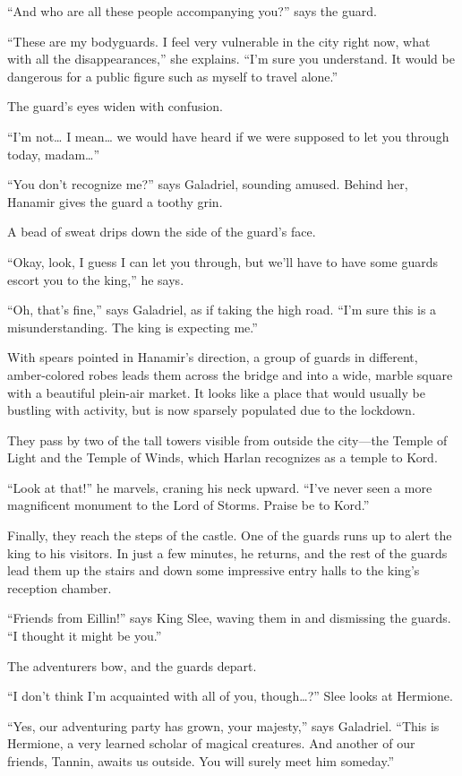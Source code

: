 \documentclass[smalldemyvopaper,11pt,twoside,onecolumn,openright,extrafontsizes]{memoir}
\begin{document}
``And who are all these people accompanying you?'' says the guard.

``These are my bodyguards. I feel very vulnerable in the city right now,
what with all the disappearances,'' she explains. ``I'm sure you
understand. It would be dangerous for a public figure such as myself to
travel alone.''

The guard's eyes widen with confusion.

``I'm not\ldots{} I mean\ldots{} we would have heard if we were supposed
to let you through today, madam\ldots{}''

``You don't recognize me?'' says Galadriel, sounding amused. Behind her,
Hanamir gives the guard a toothy grin.

A bead of sweat drips down the side of the guard's face.

``Okay, look, I guess I can let you through, but we'll have to have some
guards escort you to the king,'' he says.

``Oh, that's fine,'' says Galadriel, as if taking the high road. ``I'm
sure this is a misunderstanding. The king is expecting me.''

With spears pointed in Hanamir's direction, a group of guards in
different, amber-colored robes leads them across the bridge and into a
wide, marble square with a beautiful plein-air market. It looks like a
place that would usually be bustling with activity, but is now sparsely
populated due to the lockdown.

They pass by two of the tall towers visible from outside the city---the
Temple of Light and the Temple of Winds, which Harlan recognizes as a
temple to Kord.

``Look at that!'' he marvels, craning his neck upward. ``I've never seen
a more magnificent monument to the Lord of Storms. Praise be to Kord.''

Finally, they reach the steps of the castle. One of the guards runs up
to alert the king to his visitors. In just a few minutes, he returns,
and the rest of the guards lead them up the stairs and down some
impressive entry halls to the king's reception chamber.

``Friends from Eillin!'' says King Slee, waving them in and dismissing
the guards. ``I thought it might be you.''

The adventurers bow, and the guards depart.

``I don't think I'm acquainted with all of you, though\ldots?'' Slee
looks at Hermione.

``Yes, our adventuring party has grown, your majesty,'' says Galadriel.
``This is Hermione, a very learned scholar of magical creatures. And
another of our friends, Tannin, awaits us outside. You will surely meet
him someday.''
\end{document}
